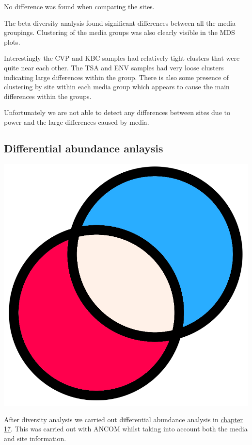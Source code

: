 \documentclass[
]{book}
\begin{document}
No difference was found when comparing the sites.

The beta diversity analysis found significant differences between all the media groupings.
Clustering of the media groups was also clearly visible in the MDS plots.

Interestingly the CVP and KBC samples had relatively tight clusters that were quite near each other.
The TSA and ENV samples had very loose clusters indicating large differences within the group.
There is also some presence of clustering by site within each media group which appears to cause the main differences within the groups.

Unfortunately we are not able to detect any differences between sites due to power and the large differences caused by media.

\hypertarget{differential-abundance-anlaysis}{%
\subsection{Differential abundance anlaysis}\label{differential-abundance-anlaysis}}

\includegraphics{figures/difference.png}

After diversity analysis we carried out differential abundance analysis in \protect\hyperlink{DA_chap}{chapter 17}.
This was carried out with ANCOM whilst taking into account both the media and site information.
\end{document}
